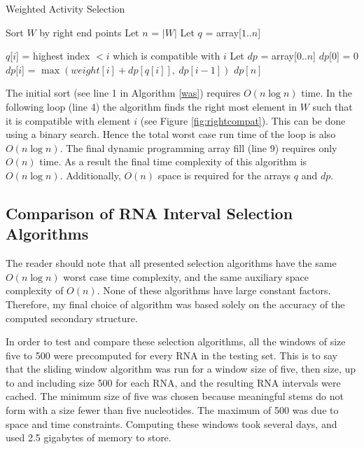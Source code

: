 \documentclass{cshonours}
\begin{document}
\begin{algorithm}
  \caption{Weighted Activity Selection}
  \label{was}
  \begin{algorithmic}[1]
  \State Sort $W$ by right end points
  \State Let $n$ = $|W|$
  \State Let $q$ = array[$1..n$]
  
  	\State $q$[$i$] = highest index $< i$ which is compatible with $i$
  \EndFor
  \State Let $dp$ = array[$0..n$]  
  \State $dp$[0] = 0
  	\State $dp$[$i$] = $\max (weight[i] + dp[q[i]], \: dp[i-1])$
  \EndFor
  \State \Return $dp[n]$
  \end{algorithmic}
\end{algorithm}

The initial sort (see line 1 in Algorithm \ref{was}) requires $O(n \log n)$ time. In the following loop (line 4) the algorithm finds the right most element in $W$ such that it is compatible with element $i$ (see Figure \ref{fig:rightcompat}). This can be done using a binary search. Hence the total worst case run time of the loop is also $O(n \log n)$. The final dynamic programming array fill (line 9) requires only $O(n)$ time. As a result the final time complexity of this algorithm is $O(n \log n)$. Additionally, $O(n)$ space is required for the arrays $q$ and $dp$.


\subsection{Comparison of RNA Interval Selection Algorithms}

The reader should note that all presented selection algorithms have the same $O(n \log n)$ worst case time complexity, and the same auxiliary space complexity of $O(n)$. None of these algorithms have large constant factors. Therefore, my final choice of algorithm was based solely on the accuracy of the computed secondary structure.

In order to test and compare these selection algorithms, all the windows of size five to 500 were precomputed for every RNA in the testing set. This is to say that the sliding window algorithm was run for a window size of five, then size, up to and including size 500 for each RNA, and the resulting RNA intervals were cached. The minimum size of five was chosen because meaningful stems do not form with a size fewer than five nucleotides. The maximum of 500 was due to space and time constraints. Computing these windows took several days, and used 2.5 gigabytes of memory to store.
\end{document}
